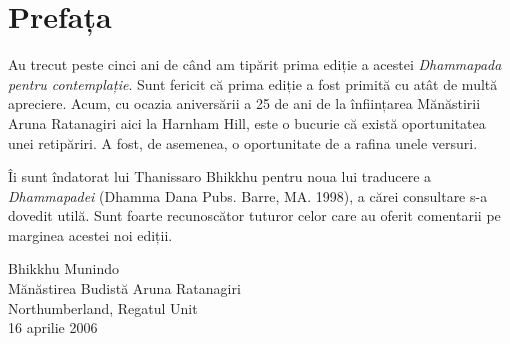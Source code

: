 
\chapter[Prefața ediției a doua (2006)]{Prefața}

Au trecut peste cinci ani de când am tipărit prima ediție a acestei \emph{Dhammapada pentru contemplație}. Sunt fericit că prima ediție a fost primită cu atât de multă apreciere. Acum, cu ocazia aniversării a 25 de ani de la înființarea Mănăstirii Aruna Ratanagiri aici la Harnham Hill, este o bucurie că există oportunitatea unei retipăriri. A fost, de asemenea, o oportunitate de a rafina unele versuri.

Îi sunt îndatorat lui Thanissaro Bhikkhu pentru noua lui traducere a \emph{Dhammapadei} (Dhamma Dana Pubs. Barre, MA. 1998), a cărei consultare s-a dovedit utilă. Sunt foarte recunoscător tuturor celor care au oferit comentarii pe marginea acestei noi ediții.

\bigskip

{\raggedleft
Bhikkhu Munindo\\
Mănăstirea Budistă Aruna Ratanagiri\\
Northumberland, Regatul Unit\\
16 aprilie 2006
\par}
